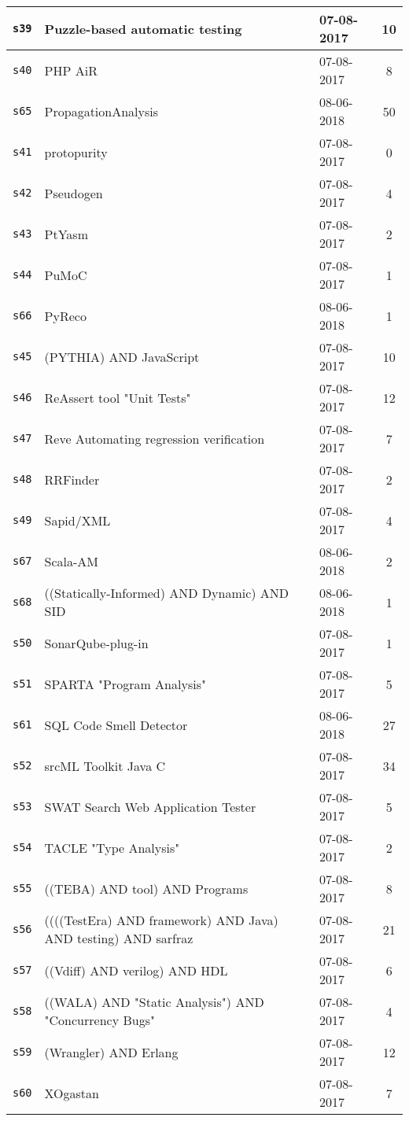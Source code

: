 \begin{longtable}{| l | p{13cm} | l | c |}
    \hline
\texttt{s39} & Puzzle-based automatic testing & 07-08-2017 & 10 \\
    \hline
\texttt{s40} & PHP AiR & 07-08-2017 & 8 \\
    \hline
\texttt{s65} & PropagationAnalysis & 08-06-2018 & 50 \\
    \hline
\texttt{s41} & protopurity & 07-08-2017 & 0 \\
    \hline
\texttt{s42} & Pseudogen & 07-08-2017 & 4 \\
    \hline
\texttt{s43} & PtYasm & 07-08-2017 & 2 \\
    \hline
\texttt{s44} & PuMoC & 07-08-2017 & 1 \\
    \hline
\texttt{s66} & PyReco & 08-06-2018 & 1 \\
    \hline
\texttt{s45} & (PYTHIA) AND JavaScript & 07-08-2017 & 10 \\
    \hline
\texttt{s46} & ReAssert tool "Unit Tests" & 07-08-2017 & 12 \\
    \hline
\texttt{s47} & Reve Automating regression verification & 07-08-2017 & 7 \\
    \hline
\texttt{s48} & RRFinder & 07-08-2017 & 2 \\
    \hline
\texttt{s49} & Sapid/XML & 07-08-2017 & 4 \\
    \hline
\texttt{s67} & Scala-AM & 08-06-2018 & 2 \\
    \hline
\texttt{s68} & ((Statically-Informed) AND Dynamic) AND SID & 08-06-2018 & 1 \\
    \hline
\texttt{s50} & SonarQube-plug-in & 07-08-2017 & 1 \\
    \hline
\texttt{s51} & SPARTA "Program Analysis" & 07-08-2017 & 5 \\
    \hline
\texttt{s61} & SQL Code Smell Detector & 08-06-2018 & 27 \\
    \hline
\texttt{s52} & srcML Toolkit Java C & 07-08-2017 & 34 \\
    \hline
\texttt{s53} & SWAT Search Web Application Tester & 07-08-2017 & 5 \\
    \hline
\texttt{s54} & TACLE "Type Analysis" & 07-08-2017 & 2 \\
    \hline
\texttt{s55} & ((TEBA) AND tool) AND Programs & 07-08-2017 & 8 \\
    \hline
\texttt{s56} & ((((TestEra) AND framework) AND Java) AND testing) AND sarfraz & 07-08-2017 & 21 \\
    \hline
\texttt{s57} & ((Vdiff) AND verilog) AND HDL & 07-08-2017 & 6 \\
    \hline
\texttt{s58} & ((WALA) AND "Static Analysis") AND "Concurrency Bugs" & 07-08-2017 & 4 \\
    \hline
\texttt{s59} & (Wrangler) AND Erlang & 07-08-2017 & 12 \\
    \hline
\texttt{s60} & XOgastan & 07-08-2017 & 7 \\
    \hline
  \hline
\end{longtable}
